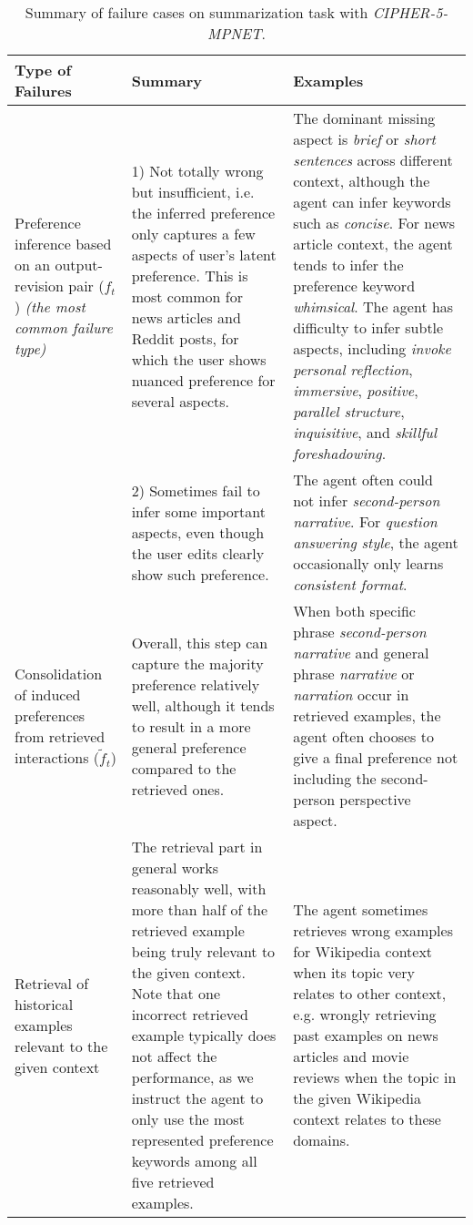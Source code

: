 \begin{table}[h!]
    \centering \small
    \caption{Summary of failure cases on summarization task with \textit{CIPHER-5-MPNET}.}   
    \begin{tabular}{p{} p{} p{}}
        \toprule
        \textbf{Type of Failures} & \textbf{Summary} & \textbf{Examples}\\
        \midrule
        Preference inference based on an output-revision pair ($f_t$) \newline \textit{(the most common failure type)}
            & 1) Not totally wrong but insufficient, i.e. the inferred preference only captures a few aspects of user's latent preference. This is most common for news articles and Reddit posts, for which the user shows nuanced preference for several aspects.
            & The dominant missing aspect is \textit{brief} or \textit{short sentences} across different context, although the agent can infer keywords such as \textit{concise}. For news article context, the agent tends to infer the preference keyword \textit{whimsical}. The agent has difficulty to infer subtle aspects, including \textit{invoke personal reflection}, \textit{immersive}, \textit{positive}, \textit{parallel structure},  \textit{inquisitive}, and \textit{skillful foreshadowing}.\vspace{5pt}
            \\ 
            & 2) Sometimes fail to infer some important aspects, even though the user edits clearly show such preference.
            & The agent often could not infer \textit{second-person narrative}. For \textit{question answering style}, the agent occasionally only learns \textit{consistent format}.
            
            \\
        \midrule
        Consolidation of induced preferences from retrieved interactions ($\tilde{f}_t$) 
            & Overall, this step can capture the majority preference relatively well, although it tends to result in a more general preference compared to the retrieved ones.
            & When both specific phrase \textit{second-person narrative} and general phrase \textit{narrative} or \textit{narration} occur in retrieved examples, the agent often chooses to give a final preference not including the second-person perspective aspect. \\
        \midrule
        Retrieval of historical examples relevant to the given context 
            & The retrieval part in general works reasonably well, with more than half of the retrieved example being truly relevant to the given context. Note that one incorrect retrieved example typically does not affect the performance, as we instruct the agent to only use the most represented preference keywords among all five retrieved examples.
            & The agent sometimes retrieves wrong examples for Wikipedia context when its topic very relates to other context, e.g. wrongly retrieving past examples on news articles and movie reviews when the topic in the given Wikipedia context relates to these domains.
        \\
        \bottomrule


\end{tabular}
\end{table}

